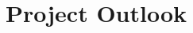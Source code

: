 \documentclass[11pt, oneside]{article}   	%
\begin{document}
\section{Project Outlook}
















%
%
%
%
%
\end{document}
